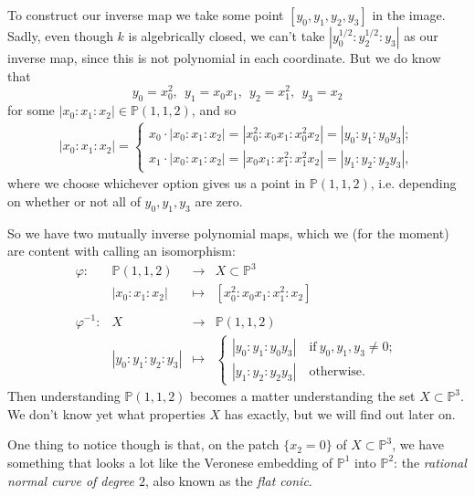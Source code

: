 \documentclass[10pt,notitlepage]{article}
\numberwithin{equation}{subsection}
\newcommand{\pee}{\mathbb{P}}
\begin{document}
\begin{example}
        To construct our inverse map we take some point $[y_0,y_1,y_2,y_3]$ in the image.
        Sadly, even though $k$ is algebrically closed, we can't take $|y_0^{1/2}:y_2^{1/2}:y_3|$ as our inverse map, since this is not polynomial in each coordinate.
        But we do know that
        \[
            y_0 = x_0^2,~~ y_1 = x_0x_1,~~ y_2 = x_1^2,~~ y_3 = x_2
        \]
        for some $|x_0:x_1:x_2|\in\pee(1,1,2)$, and so
        \begin{align*}
            |x_0:x_1:x_2| =
            \begin{cases}
                x_0\cdot|x_0:x_1:x_2| = |x_0^2:x_0x_1:x_0^2x_2| =|y_0:y_1:y_0y_3|; \\
                x_1\cdot|x_0:x_1:x_2| = |x_0x_1:x_1^2:x_1^2x_2| =|y_1:y_2:y_2y_3|,
            \end{cases}
        \end{align*}
        where we choose whichever option gives us a point in $\pee(1,1,2)$, i.e. depending on whether or not all of $y_0,y_1,y_3$ are zero.

        So we have two mutually inverse polynomial maps, which we (for the moment) are content with calling an isomorphism:
        \begin{equation*}
            \begin{array}{rlcl}
                \varphi\colon & \pee(1,1,2) & \to & X\subset\pee^3 \\
                & |x_0:x_1:x_2| & \mapsto & [x_0^2:x_0x_1:x_1^2:x_2] \\
                & & & \\
                \varphi^{-1}\colon & X &\to & \pee(1,1,2) \\
                & |y_0:y_1:y_2:y_3| & \mapsto &
                    \begin{cases}
                        |y_0:y_1:y_0y_3|\quad\mbox{if}~y_0,y_1,y_3\neq0; \\
                        |y_1:y_2:y_2y_3|\quad\mbox{otherwise}.
                    \end{cases}
            \end{array}
        \end{equation*}
        Then understanding $\pee(1,1,2)$ becomes a matter understanding the set $X\subset\pee^3$.
        We don't know yet what properties $X$ has exactly, but we will find out later on.

        One thing to notice though is that, on the patch $\{x_2=0\}$ of $X\subset\pee^3$, we have something that looks a lot like the Veronese embedding of $\pee^1$ into $\pee^2$: the \emph{rational normal curve of degree $2$}, also known as the \emph{flat conic}.\qedhere
    \end{example}
\end{document}
